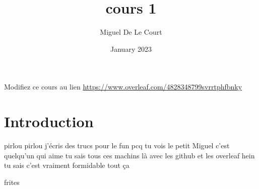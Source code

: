 \documentclass{article}
\title{cours 1}
\author{Miguel De Le Court}
\date{January 2023}
\begin{document}
\maketitle
Modifiez ce cours au lien \url{https://www.overleaf.com/4828348799svrrtphfbnky}

\section{Introduction}


pirlou pirlou j'écris des trucs pour le fun pcq tu vois le petit Miguel c'est quelqu'un qui aime tu sais tous ces machins là avec les github et les overleaf hein tu sais c'est vraiment formidable tout ça

frites
\end{document}
